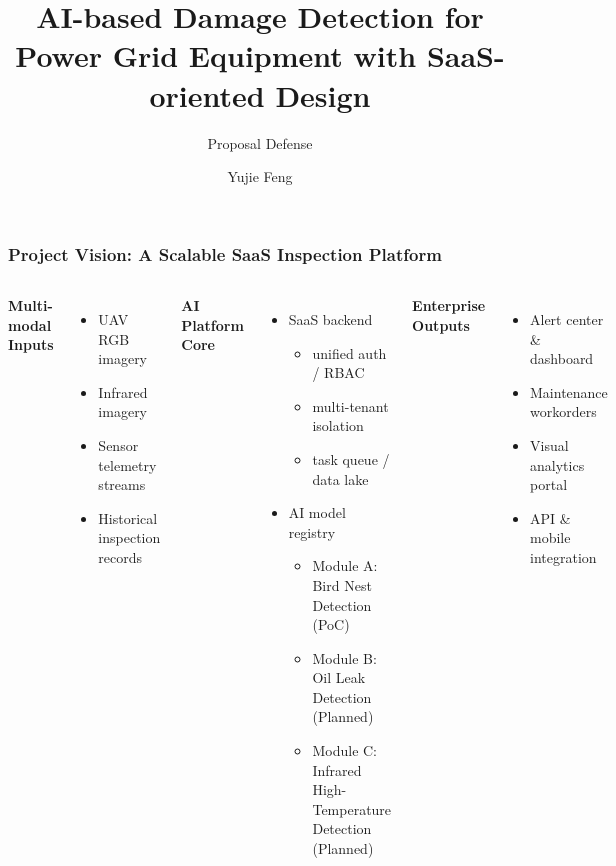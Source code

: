 \documentclass[aspectratio=169]{beamer}
\title{AI-based Damage Detection for Power Grid Equipment with SaaS-oriented Design}
\subtitle{Proposal Defense}
\author{Yujie Feng}
\institute{Supervisor: Jin Hou}
\date{}
\begin{document}
\begin{frame}
  \titlepage
\end{frame}

\begin{frame}
\frametitle{Project Vision: A Scalable SaaS Inspection Platform}
\vspace{-5pt}
\small
\begin{columns}
\textbf{Multi-modal Inputs}
\begin{itemize}
  \item UAV RGB imagery
  \item Infrared imagery
  \item Sensor telemetry streams
  \item Historical inspection records
\end{itemize}

\textbf{AI Platform Core}
\begin{itemize}
  \item SaaS backend
    \begin{itemize}
      \item unified auth / RBAC
      \item multi-tenant isolation
      \item task queue / data lake
    \end{itemize}
  \item AI model registry
    \begin{itemize}
      \item Module A: Bird Nest Detection (PoC)
      \item Module B: Oil Leak Detection (Planned)
      \item Module C: Infrared High-Temperature Detection (Planned)
    \end{itemize}
\end{itemize}

\textbf{Enterprise Outputs}
\begin{itemize}
  \item Alert center \& dashboard
  \item Maintenance workorders
  \item Visual analytics portal
  \item API \& mobile integration
\end{itemize}
\end{columns}
\end{frame}
\end{document}
